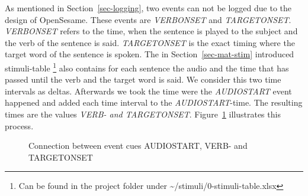 \documentclass[
  12pt,
  letterpaper,
  DIV=11,
  numbers=noendperiod]{scrreprt}
\newenvironment{Shaded}{\begin{snugshade}}{\end{snugshade}}
\newcommand{\BuiltInTok}[1]{\textcolor[rgb]{0.00,0.23,0.31}{#1}}
\newcommand{\CommentTok}[1]{\textcolor[rgb]{0.37,0.37,0.37}{#1}}
\newcommand{\ControlFlowTok}[1]{\textcolor[rgb]{0.00,0.23,0.31}{\textbf{#1}}}
\newcommand{\DecValTok}[1]{\textcolor[rgb]{0.68,0.00,0.00}{#1}}
\newcommand{\NormalTok}[1]{\textcolor[rgb]{0.00,0.23,0.31}{#1}}
\newcommand{\OperatorTok}[1]{\textcolor[rgb]{0.37,0.37,0.37}{#1}}
\newcommand{\StringTok}[1]{\textcolor[rgb]{0.13,0.47,0.30}{#1}}
\newcommand{\VariableTok}[1]{\textcolor[rgb]{0.07,0.07,0.07}{#1}}
\begin{document}
%

As mentioned in Section~\ref{sec-logging}, two events can not be logged
due to the design of OpenSesame. These events are \emph{VERBONSET} and
\emph{TARGETONSET}. \emph{VERBONSET} refers to the time, when the
sentence is played to the subject and the verb of the sentence is said.
\emph{TARGETONSET} is the exact timing where the target word of the
sentence is spoken. The in Section~\ref{sec-mat-stim} introduced
stimuli-table \footnote{Can be found in the project folder under
  \textasciitilde/stimuli/0-stimuli-table.xlsx} also contains for each
sentence the audio and the time that has passed until the verb and the
target word is said. We consider this two time intervals as deltas.
Afterwards we took the time were the \emph{AUDIOSTART} event happened
and added each time interval to the \emph{AUDIOSTART}-time. The
resulting times are the values \emph{VERB- and TARGETONSET}.
Figure~\ref{fig-verbtargetonset} illustrates this process.

\begin{figure}


\caption{\label{fig-verbtargetonset}Connection between event cues
AUDIOSTART, VERB- and TARGETONSET}

\end{figure}%
\end{document}
